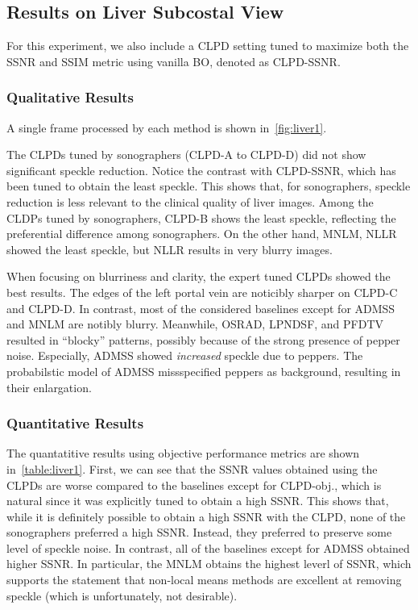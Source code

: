 \subsection{Results on Liver Subcostal View}
For this experiment, we also include a CLPD setting tuned to maximize both the SSNR and SSIM metric using vanilla BO, denoted as CLPD-SSNR.

\subsubsection{Qualitative Results}
A single frame processed by each method is shown in~\cref{fig:liver1}.

The CLPDs tuned by sonographers (CLPD-A to CLPD-D) did not show significant speckle reduction.
Notice the contrast with CLPD-SSNR, which has been tuned to obtain the least speckle.
This shows that, for sonographers, speckle reduction is less relevant to the clinical quality of liver images.
Among the CLDPs tuned by sonographers, CLPD-B shows the least speckle, reflecting the preferential difference among sonographers.
On the other hand, MNLM, NLLR showed the least speckle, but NLLR results in very blurry images.

When focusing on blurriness and clarity, the expert tuned CLPDs showed the best results.
The edges of the left portal vein are noticibly sharper on CLPD-C and CLPD-D.
In contrast, most of the considered baselines except for ADMSS and MNLM are notibly blurry.
Meanwhile, OSRAD, LPNDSF, and PFDTV resulted in ``blocky'' patterns, possibly because of the strong presence of pepper noise. 
Especially, ADMSS showed \textit{increased} speckle due to peppers.
The probabilstic model of ADMSS missspecified peppers as background, resulting in their enlargation.


%
\subsubsection{Quantitative Results}
The quantatitive results using objective performance metrics are shown in~\cref{table:liver1}.
First, we can see that the SSNR values obtained using the CLPDs are worse compared to the baselines except for CLPD-obj., which is natural since it was explicitly tuned to obtain a high SSNR.
This shows that, while it is definitely possible to obtain a high SSNR with the CLPD, none of the sonographers preferred a high SSNR.
Instead, they preferred to preserve some level of speckle noise.
In contrast, all of the baselines except for ADMSS obtained higher SSNR.
In particular, the MNLM obtains the highest leverl of SSNR, which supports the statement that non-local means methods are excellent at removing speckle (which is unfortunately, not desirable).

